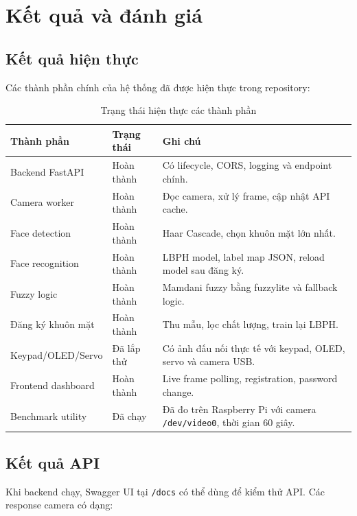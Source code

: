 \section{Kết quả và đánh giá}

\subsection{Kết quả hiện thực}

Các thành phần chính của hệ thống đã được hiện thực trong repository:

\begin{table}[H]
\centering
\caption{Trạng thái hiện thực các thành phần}
\label{tab:implementation_status}
\begin{tabularx}{\textwidth}{|l|l|X|}
\hline
\textbf{Thành phần} & \textbf{Trạng thái} & \textbf{Ghi chú} \\
\hline
Backend FastAPI & Hoàn thành & Có lifecycle, CORS, logging và endpoint chính. \\
\hline
Camera worker & Hoàn thành & Đọc camera, xử lý frame, cập nhật API cache. \\
\hline
Face detection & Hoàn thành & Haar Cascade, chọn khuôn mặt lớn nhất. \\
\hline
Face recognition & Hoàn thành & LBPH model, label map JSON, reload model sau đăng ký. \\
\hline
Fuzzy logic & Hoàn thành & Mamdani fuzzy bằng fuzzylite và fallback logic. \\
\hline
Đăng ký khuôn mặt & Hoàn thành & Thu mẫu, lọc chất lượng, train lại LBPH. \\
\hline
Keypad/OLED/Servo & Đã lắp thử & Có ảnh đấu nối thực tế với keypad, OLED, servo và camera USB. \\
\hline
Frontend dashboard & Hoàn thành & Live frame polling, registration, password change. \\
\hline
Benchmark utility & Đã chạy & Đã đo trên Raspberry Pi với camera \texttt{/dev/video0}, thời gian 60 giây. \\
\hline
\end{tabularx}
\end{table}

\subsection{Kết quả API}

Khi backend chạy, Swagger UI tại \texttt{/docs} có thể dùng để kiểm thử API. Các response camera có dạng:

